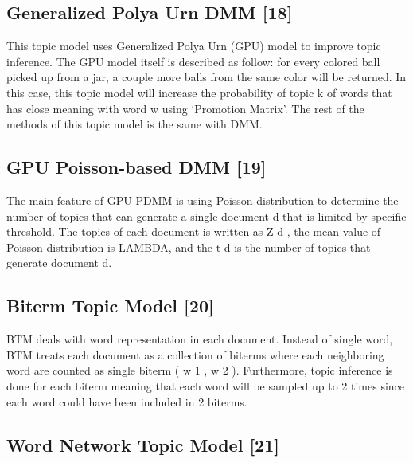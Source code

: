 \documentclass[senior]{IPSstyle}
\begin{document}
\subsection{Generalized Polya Urn DMM [18]}

This topic model uses Generalized Polya Urn (GPU) model to improve topic inference. The GPU model itself is described as follow: for every colored ball picked up from a jar, a couple more balls from the same color will be returned. In this case, this topic model will increase the probability of topic k of words that has close meaning with word w using ‘Promotion Matrix’. The rest of the methods of this topic model is the same with DMM.

\subsection{GPU Poisson-based DMM [19]}

The main feature of GPU-PDMM is using Poisson distribution to determine the number of topics that can generate a single document d that is limited by specific threshold. The topics of each document is written as Z d , the mean value of Poisson distribution is LAMBDA, and the t d is the number of topics that generate document d.

\subsection{Biterm Topic Model [20]}

BTM deals with word representation in each document. Instead of single word, BTM treats each document as a collection of biterms where each neighboring word are counted as single biterm ( w 1 , w 2 ). Furthermore, topic inference is done for each biterm meaning that each word will be sampled up to 2 times since each word could have been included in 2 biterms.

\subsection{Word Network Topic Model [21]}
\end{document}
